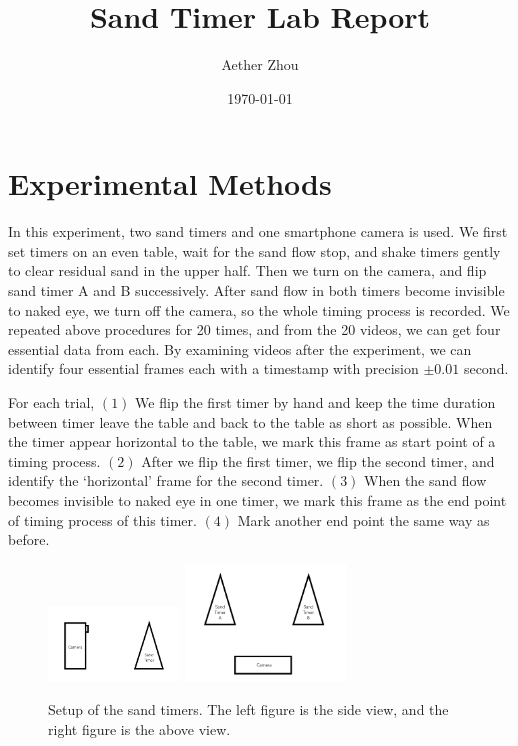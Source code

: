\documentclass[twocolumn,preprintnumbers,amsmath,amssymb,longbibliography]{revtex4-1}
\begin{document}
\title{Sand Timer Lab Report}%

\author{Aether Zhou}
%

\date{\today}%

\maketitle


\section{Experimental Methods}
In this experiment, two sand timers and one smartphone camera is used. We first set timers on an even table, wait for the sand flow stop, and shake timers gently to clear residual sand in the upper half. Then we turn on the camera, and flip sand timer A and B successively. After sand flow in both timers become invisible to naked eye, we turn off the camera, so the whole timing process is recorded. We repeated above procedures for 20 times, and from the 20 videos, we can get four essential data from each. By examining videos after the experiment, we can identify four essential frames each with a timestamp with precision $\pm 0.01$ second. 

For each trial, $(1)$ We flip the first timer by hand and keep the time duration between timer leave the table and back to the table as short as possible. When the timer appear horizontal to the table, we mark this frame as start point of a timing process. $(2)$ After we flip the first timer, we flip the second timer, and identify the `horizontal' frame for the second timer. $(3)$ When the sand flow becomes invisible to naked eye in one timer, we mark this frame as the end point of timing process of this timer. $(4)$ Mark another end point the same way as before. 


\begin{figure}[H]
\includegraphics[width=3.5cm]{setting_1.png}
\includegraphics[width=4.3cm]{setting_2.png}
\caption{\label{setup} Setup of the sand timers. The left figure is the side view, and the right figure is the above view.} 
\end{figure}
\end{document}
